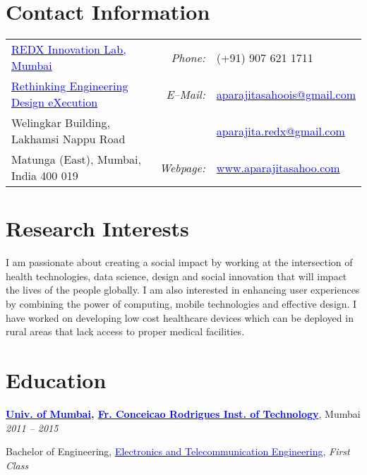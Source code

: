 \documentclass[margin,line]{res}
\newenvironment{list1}{
  \begin{list}{\ding{113}}{%
      \setlength{\itemsep}{0in}
      \setlength{\parsep}{0in} \setlength{\parskip}{0in}
      \setlength{\topsep}{0in} \setlength{\partopsep}{0in}
      \setlength{\leftmargin}{0.17in}}}{\end{list}}
\begin{document}

\begin{resume}
\section{\sc Contact Information}
\vspace{.05in}
\begin{tabular}{@{}p{2.9in}p{.5in}p{3in}}
\href{https://redxmumbai.com/}{\textcolor{blue} {REDX Innovation Lab, Mumbai}} & \multicolumn{1}{r}{\it Phone:}  &(+91) 907 621 1711 \\
\href{http://redx.io/}{\textcolor{blue} {Rethinking Engineering Design eXecution}} &\multicolumn{1}{r}{\it E--Mail:}& \href{mailto:aparajitasahoois@gmail.com}{\textcolor{blue}{aparajitasahoois@gmail.com}} \\
Welingkar Building, Lakhamsi Nappu Road & & \href{mailto:aparajita.redx@gmail.com}{\textcolor{blue}{aparajita.redx@gmail.com}} \\
Matunga (East), Mumbai, India 400 019 & \multicolumn{1}{r}{\it Webpage:} &\href{http://www.aparajitasahoo.com/}{\textcolor{blue}{www.aparajitasahoo.com}} \\
\end{tabular}

\section{\sc Research Interests}
\lettrine[lines=2]{I}{} am passionate about creating a social impact by working at the intersection of health technologies, data science, design and social innovation that will impact the lives of the people globally. I am also interested in enhancing  user experiences by combining the power of computing, mobile technologies and effective design. I have worked on developing low cost healthcare devices which can be deployed in rural areas that lack access to proper medical facilities.

\section{\sc Education}
{\bf \href{http://mu.ac.in/portal/}{\textcolor{blue}{Univ. of Mumbai}}, \href{http://fcrit.ac.in/}{\textcolor{blue}{Fr. Conceicao Rodrigues Inst. of Technology}}}, Mumbai \hfill {\textit{2011 -- 2015}} \\
\vspace*{-.15in}
\begin{list1}
\item[] Bachelor of Engineering, \href{http://www.extc.fcrit.ac.in/}{\textcolor{blue}{Electronics and Telecommunication Engineering}}, \textit{First Class}
\end{list1}


\end{resume}
\end{document}
